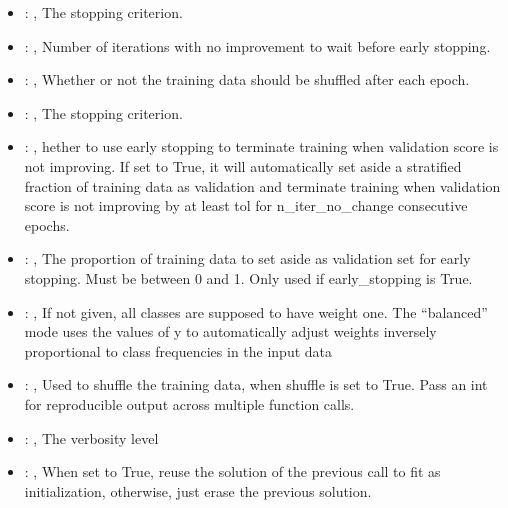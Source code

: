 \begin{itemize}
    \item {}: , 
      The stopping criterion.

    \item {}: , 
      Number of iterations with no improvement to wait before early stopping.

    \item {}: , 
      Whether or not the training data should be shuffled after each epoch.

    \item {}: , 
      The stopping criterion.

    \item {}: , 
      hether to use early stopping to terminate training when validation score is not
      improving. If set to True, it will automatically set aside a stratified fraction of training
      data as validation and terminate training when validation score is not improving by at least
      tol for n\_iter\_no\_change consecutive epochs.

    \item {}: , 
      The proportion of training data to set aside as validation set for early stopping.
      Must be between 0 and 1. Only used if early\_stopping is True.

    \item {}: \xmlDesc{[balanced]}, 
      If not given, all classes are supposed to have weight one.
      The “balanced” mode uses the values of y to automatically adjust weights
      inversely proportional to class frequencies in the input data

    \item {}: , 
      Used to shuffle the training data, when shuffle is set to
      True. Pass an int for reproducible output across multiple function calls.

    \item {}: , 
      The verbosity level

    \item {}: , 
      When set to True, reuse the solution of the previous call
      to fit as initialization, otherwise, just erase the previous solution.
  \end{itemize}


